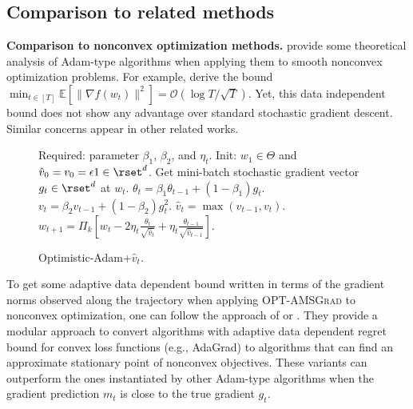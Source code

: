 \documentclass[wcp]{jmlr}
\begin{document}
\subsection{Comparison to related methods} \label{sec:related}


\textbf{Comparison to nonconvex optimization methods.}\hspace{0.1in}
\citet{ZRSKK18,CLSH19,WWB18,ZTYCG18,ZS18,LO18} provide some theoretical analysis of Adam-type algorithms when applying them to smooth nonconvex optimization problems. 
For example, \citet{CLSH19} derive the bound $\min_{t \in [T]} \mathbb{E}[\| \nabla f(w_t) \|^2 ] = \mathcal{O}(\log T / \sqrt{T}) $.
Yet, this data independent bound does not show any advantage over standard stochastic gradient descent. 
Similar concerns appear in other related works.

\begin{figure}\vspace{-0.9cm}
\begin{minipage}{\linewidth}
\begin{algorithm}[H]
\begin{algorithmic}[1]
\caption{Optimistic-Adam+$\hat{v}_t$. \label{OPT-DISZ}}
\STATE Required: parameter $\beta_1$, $\beta_2$, and $\eta_t$.
\STATE Init: $w_1 \in \Theta$ and $\hat{v}_0 = v_{0} = \epsilon 1 \in \rset^{d}$.
\STATE Get mini-batch stochastic gradient vector $g_t \in \rset^d$ at $w_t$.
\STATE $\theta_t = \beta_{1} \theta_{t-1} + (1 - \beta_{1}) g_t$.
\STATE $v_t = \beta_2 v_{t-1} + (1 - \beta_2) g_t^2$.
\STATE $\hat{v}_t = \max( \hat{v}_{t-1} , v_t )$.
\STATE $w_{t+1} = \Pi_{k}[ w_{t} - 2 \eta_t \frac{\theta_t}{ \sqrt{\hat{v}_t }}
+ \eta_t \frac{\theta_{t-1}}{ \sqrt{\hat{v}_{t-1}} }]$.
\ENDFOR
\end{algorithmic}
\end{algorithm}
\vspace{-0.1in}
\end{minipage}\end{figure}
To get some adaptive data dependent bound written in terms of the gradient norms observed along the trajectory when applying  \textsc{OPT-AMSGrad} to nonconvex optimization, one can follow the approach of \citet{Princeton18} or \citet{CYYZC19}.
They provide a modular approach to convert algorithms with adaptive data dependent regret bound for convex loss functions (e.g., AdaGrad) to algorithms that can find an approximate stationary point of nonconvex objectives. 
These variants can outperform the ones instantiated by other Adam-type algorithms when the gradient prediction $m_t$ is close to the true gradient $g_t$.
\end{document}
